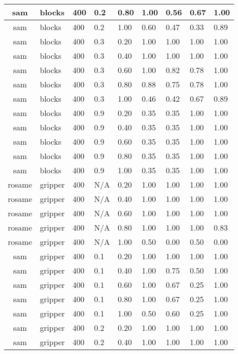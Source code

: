 \begin{table}[ht]
\begin{tabular}{c}
sam & blocks & 400 & 0.2 & 0.80 & 1.00 & 0.56 & 0.67 & 1.00 \\ \hline
sam & blocks & 400 & 0.2 & 1.00 & 0.60 & 0.47 & 0.33 & 0.89 \\ \hline
sam & blocks & 400 & 0.3 & 0.20 & 1.00 & 1.00 & 1.00 & 1.00 \\ \hline
sam & blocks & 400 & 0.3 & 0.40 & 1.00 & 1.00 & 1.00 & 1.00 \\ \hline
sam & blocks & 400 & 0.3 & 0.60 & 1.00 & 0.82 & 0.78 & 1.00 \\ \hline
sam & blocks & 400 & 0.3 & 0.80 & 0.88 & 0.75 & 0.78 & 1.00 \\ \hline
sam & blocks & 400 & 0.3 & 1.00 & 0.46 & 0.42 & 0.67 & 0.89 \\ \hline
sam & blocks & 400 & 0.9 & 0.20 & 0.35 & 0.35 & 1.00 & 1.00 \\ \hline
sam & blocks & 400 & 0.9 & 0.40 & 0.35 & 0.35 & 1.00 & 1.00 \\ \hline
sam & blocks & 400 & 0.9 & 0.60 & 0.35 & 0.35 & 1.00 & 1.00 \\ \hline
sam & blocks & 400 & 0.9 & 0.80 & 0.35 & 0.35 & 1.00 & 1.00 \\ \hline
sam & blocks & 400 & 0.9 & 1.00 & 0.35 & 0.35 & 1.00 & 1.00 \\ \hline
rosame & gripper & 400 & N/A & 0.20 & 1.00 & 1.00 & 1.00 & 1.00 \\ \hline
rosame & gripper & 400 & N/A & 0.40 & 1.00 & 1.00 & 1.00 & 1.00 \\ \hline
rosame & gripper & 400 & N/A & 0.60 & 1.00 & 1.00 & 1.00 & 1.00 \\ \hline
rosame & gripper & 400 & N/A & 0.80 & 1.00 & 1.00 & 1.00 & 0.83 \\ \hline
rosame & gripper & 400 & N/A & 1.00 & 0.50 & 0.00 & 0.50 & 0.00 \\ \hline
sam & gripper & 400 & 0.1 & 0.20 & 1.00 & 1.00 & 1.00 & 1.00 \\ \hline
sam & gripper & 400 & 0.1 & 0.40 & 1.00 & 0.75 & 0.50 & 1.00 \\ \hline
sam & gripper & 400 & 0.1 & 0.60 & 1.00 & 0.67 & 0.25 & 1.00 \\ \hline
sam & gripper & 400 & 0.1 & 0.80 & 1.00 & 0.67 & 0.25 & 1.00 \\ \hline
sam & gripper & 400 & 0.1 & 1.00 & 0.50 & 0.60 & 0.25 & 1.00 \\ \hline
sam & gripper & 400 & 0.2 & 0.20 & 1.00 & 1.00 & 1.00 & 1.00 \\ \hline
sam & gripper & 400 & 0.2 & 0.40 & 1.00 & 1.00 & 1.00 & 1.00 \\ \hline

\end{tabular}
\end{table}
